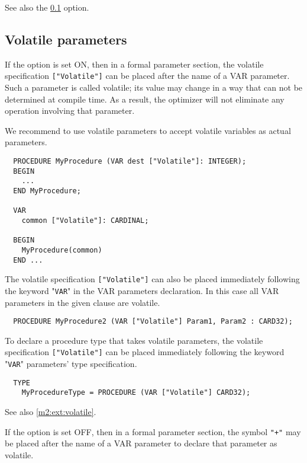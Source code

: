 See also the \ref{m2:ext:volatile:param} option.


\subsection{Volatile parameters}\label{m2:ext:volatile:param}

\mextonly

If the option  is set ON, then in a formal 
parameter section, the volatile specification \verb|["Volatile"]|
can be placed after the name of a VAR parameter. Such a parameter
is called volatile; its value may change in a way that can not be
determined at compile time. As a result, the optimizer will not
eliminate any operation involving that parameter. 

We recommend to use volatile parameters to accept volatile variables 
as actual parameters.

\Example
\begin{verbatim}
  PROCEDURE MyProcedure (VAR dest ["Volatile"]: INTEGER);
  BEGIN
    ...
  END MyProcedure;
  
  VAR
    common ["Volatile"]: CARDINAL;
    
  BEGIN
    MyProcedure(common)
  END ...
\end{verbatim}

The volatile specification \verb|["Volatile"]| can also be placed
immediately following the keyword "{\tt VAR}" in the VAR parameters
declaration. In this case all VAR parameters in the given clause
are volatile.

\Example
\begin{verbatim}
  PROCEDURE MyProcedure2 (VAR ["Volatile"] Param1, Param2 : CARD32);
\end{verbatim}

To declare a procedure type that takes volatile parameters, the volatile 
specification \verb|["Volatile"]| can be placed immediately following 
the keyword "{\tt VAR}" parameters' type specification.

\Example
\begin{verbatim}
  TYPE
    MyProcedureType = PROCEDURE (VAR ["Volatile"] CARD32);
\end{verbatim}

See also \ref{m2:ext:volatile}.


If the option  is set OFF, then in a formal parameter 
section, the symbol \verb|"+"| may be placed after the name of a VAR parameter 
to declare that parameter as volatile.

